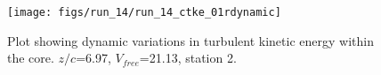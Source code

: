 \begin{figure}[H]
\centering
\texttt{[image: figs/run\_14/run\_14\_ctke\_01rdynamic]}
\caption{Plot showing dynamic variations in turbulent kinetic energy within the core. $z/c$=6.97, $V_{free}$=21.13, station 2.}
\label{fig:run_14_ctke_01rdynamic}
\end{figure}


